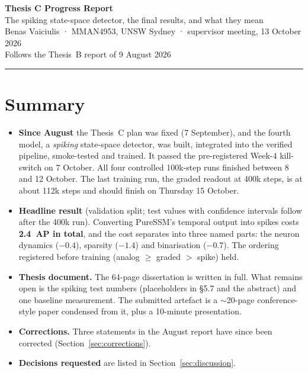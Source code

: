 \documentclass[10pt,a4paper]{article}
\begin{document}
\begin{center}
{\Large\bfseries Thesis C Progress Report}\\[3pt]
{\large The spiking state-space detector, the final results, and what they mean}\\[5pt]
\small Benas Vaiciulis \;·\; MMAN4953, UNSW Sydney \;·\; supervisor meeting, 13 October 2026\\
\small Follows the Thesis~B report of 9 August 2026
\end{center}
\hrule
\vspace{4pt}

\section*{Summary}

\begin{itemize}
  \item \textbf{Since August} the Thesis~C plan was fixed (7 September), and the fourth model, a
  \emph{spiking} state-space detector, was built, integrated into the verified pipeline, smoke-tested and
  trained. It passed the pre-registered Week-4 kill-switch on 7 October. All four controlled 100k-step runs
  finished between 8 and 12 October. The last training run, the graded readout at 400k steps, is at about
  112k steps and should finish on Thursday 15 October.
  \item \textbf{Headline result} (validation split; test values with confidence intervals follow after the
  400k run). Converting PureSSM's temporal output into spikes costs \textbf{2.4~AP in total}, and the cost
  separates into three named parts: the neuron dynamics ($-0.4$), sparsity ($-1.4$) and binarisation
  ($-0.7$). The ordering registered before training (analog $\geq$ graded $>$ spike) held.
  \item \textbf{Thesis document.} The 64-page dissertation is written in full. What remains open is the
  spiking test numbers (placeholders in §5.7 and the abstract) and one baseline measurement. The submitted
  artefact is a $\sim$20-page conference-style paper condensed from it, plus a 10-minute presentation.
  \item \textbf{Corrections.} Three statements in the August report have since been corrected (Section~\ref{sec:corrections}).
  \item \textbf{Decisions requested} are listed in Section~\ref{sec:discussion}.
\end{itemize}

\end{document}
